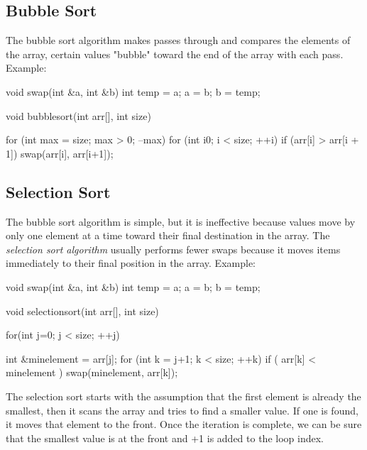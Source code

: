 \documentclass{report}
\begin{document}
    \pagebreak \bigbreak \noindent 
    \subsection{Bubble Sort}
    \bigbreak \noindent 
    The bubble sort algorithm makes passes through and compares the elements of the array, certain values "bubble" toward the end of the array with each pass.
    \bigbreak \noindent 
    Example:
    \bigbreak \noindent 
    
    \begin{cppcode}
void swap(int &a, int &b) {
    int temp = a;
    a = b;
    b = temp;
}

void bubblesort(int arr[], int size) {

    for (int max = size; max > 0; --max) {
        for (int i{0}; i < size; ++i) {
            if (arr[i] > arr[i + 1]) {
                swap(arr[i], arr[i+1]);
            }
        }
    } 
}
    \end{cppcode}
    

    \bigbreak \noindent 
    \subsection{Selection Sort}
    \bigbreak \noindent 
    The bubble sort algorithm is simple, but it is ineffective because values move by only one element at a time toward their final destination in the array. The \textit{selection sort algorithm} usually performs fewer swaps because it moves items immediately to their final position in the array. 
    \bigbreak \noindent 
    Example:
    \bigbreak \noindent 
    
    \begin{cppcode}
void swap(int &a, int &b) {
    int temp = a;
    a = b;
    b = temp;
}

void selectionsort(int arr[], int size) {


    for(int j=0; j < size; ++j) {
        int &minelement = arr[j];
        for (int k = j+1; k < size; ++k) {
            if ( arr[k] < minelement ) {
                swap(minelement, arr[k]);
            }
        }

    }
}
    \end{cppcode}
    

    \pagebreak \bigbreak \noindent 
    The selection sort starts with the assumption that the first element is already the smallest, then it scans the array and tries to find a smaller value. If one is found, it moves that element to the front. Once the iteration is complete, we can be sure that the smallest value is at the front and +1 is added to the loop index.
\end{document}
